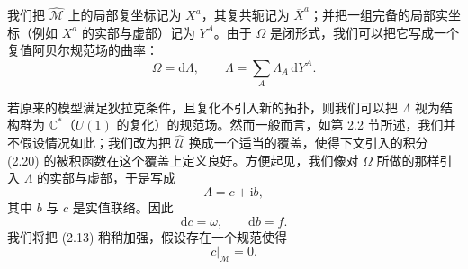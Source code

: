 \documentclass[11pt,a4paper,UTF8]{ctexart}
\theoremstyle{plain}
\theoremstyle{definition}
\begin{document}

我们把 $\widehat{\mathcal{M}}$ 上的局部复坐标记为 $X^a$，其复共轭记为 $\overline{X}^a$；并把一组完备的局部实坐标（例如 $X^a$ 的实部与虚部）记为 $Y^A$。由于 $\Omega$ 是闭形式，我们可以把它写成一个复值阿贝尔规范场的曲率：
\begin{equation}
    \Omega = \mathrm{d}\Lambda,\qquad \Lambda=\sum_{A}\Lambda_A\,\mathrm{d}Y^A .
    \tag{2.14}
\end{equation}


若原来的模型满足狄拉克条件，且复化不引入新的拓扑，则我们可以把 $\Lambda$ 视为结构群为 $\mathbb{C}^*$（$U(1)$ 的复化）的规范场。然而一般而言，如第 2.2 节所述，我们并不假设情况如此；我们改为把 $\widehat{\mathcal{U}}$ 换成一个适当的覆盖，使得下文引入的积分 (2.20) 的被积函数在这个覆盖上定义良好。方便起见，我们像对 $\Omega$ 所做的那样引入 $\Lambda$ 的实部与虚部，于是写成
\begin{equation}
    \Lambda = c+\mathrm{i}b,
    \tag{2.15}
\end{equation}
其中 $b$ 与 $c$ 是实值联络。因此
\begin{equation}
    \mathrm{d}c = \omega,\qquad \mathrm{d}b = f .
    \tag{2.16}
\end{equation}
我们将把 (2.13) 稍稍加强，假设存在一个规范使得
\begin{equation}
    c|_{\mathcal{M}} = 0 .
    \tag{2.17}
\end{equation}

\end{document}
